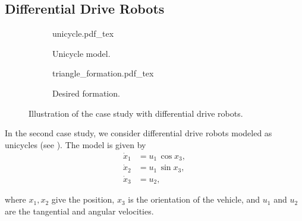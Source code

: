 \subsection{Differential Drive Robots}
\begin{figure}[b]
    \centering
    \begin{subfigure}[t]{0.35\textwidth}
        \centering
        \def\svgwidth{0.71\textwidth}
        {unicycle.pdf_tex}
        \vspace*{-1.5mm}
        \caption{Unicycle model.}
        \label{fig:MPC_unicycle}        
        \vspace*{-3mm}
    \end{subfigure}
    \hspace*{0.1\textwidth}
    \begin{subfigure}[t]{0.35\textwidth}
        \centering
        \def\svgwidth{0.71\textwidth}
        {triangle_formation.pdf_tex}
        \vspace*{-1mm}
        \caption{Desired formation.}
        \label{fig:MPC_triangle_formation}
        \vspace*{-3mm}
    \end{subfigure}
    \caption{Illustration of the case study with differential drive robots.}
\end{figure}

In the second case study, we consider differential drive robots modeled as unicycles (see ).
The model is given by
\begin{subequations}
    \begin{align}
        \dot{x}_1 &= u_1\,\cos x_3, \\
        \dot{x}_2 &= u_1\,\sin x_3, \\
        \dot{x}_3 &= u_2,
    \end{align} \label{eq:MPC_unicycle_ode_x} 
\end{subequations}

\noindent where $x_1, x_2$ give the position, $x_3$ is the orientation of the vehicle, and $u_1$ and $u_2$ are the tangential and angular velocities.

